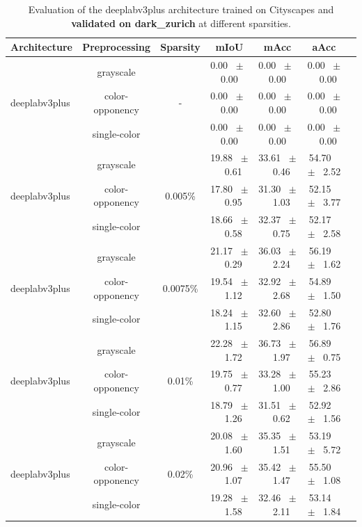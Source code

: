 \begin{table}[h]
  \centering
  \caption{Evaluation of the deeplabv3plus architecture trained on Cityscapes and \textbf{validated on dark_zurich} at different sparsities.}
  \begin{tabular}{@{}lccc ccc@{}}
    \toprule
    Architecture & Preprocessing & Sparsity & mIoU & mAcc & aAcc \\
    \midrule
    \midrule
    \midrule
    \multirow{3}{*}{deeplabv3plus} & grayscale & \multirow{3}{*}{-} & 0.00 ~$\pm$~ 0.00 & 0.00 ~$\pm$~ 0.00 & 0.00 ~$\pm$~ 0.00 \\
    & color-opponency & & 0.00 ~$\pm$~ 0.00 & 0.00 ~$\pm$~ 0.00 & 0.00 ~$\pm$~ 0.00 \\
    & single-color & & 0.00 ~$\pm$~ 0.00 & 0.00 ~$\pm$~ 0.00 & 0.00 ~$\pm$~ 0.00 \\
    \midrule
    \multirow{3}{*}{deeplabv3plus} & grayscale & \multirow{3}{*}{0.005\%} & 19.88 ~$\pm$~ 0.61 & 33.61 ~$\pm$~ 0.46 & 54.70 ~$\pm$~ 2.52 \\
    & color-opponency & & 17.80 ~$\pm$~ 0.95 & 31.30 ~$\pm$~ 1.03 & 52.15 ~$\pm$~ 3.77 \\
    & single-color & & 18.66 ~$\pm$~ 0.58 & 32.37 ~$\pm$~ 0.75 & 52.17 ~$\pm$~ 2.58 \\
    \midrule
    \multirow{3}{*}{deeplabv3plus} & grayscale & \multirow{3}{*}{0.0075\%} & 21.17 ~$\pm$~ 0.29 & 36.03 ~$\pm$~ 2.24 & 56.19 ~$\pm$~ 1.62 \\
    & color-opponency & & 19.54 ~$\pm$~ 1.12 & 32.92 ~$\pm$~ 2.68 & 54.89 ~$\pm$~ 1.50 \\
    & single-color & & 18.24 ~$\pm$~ 1.15 & 32.60 ~$\pm$~ 2.86 & 52.80 ~$\pm$~ 1.76 \\
    \midrule
    \multirow{3}{*}{deeplabv3plus} & grayscale & \multirow{3}{*}{0.01\%} & 22.28 ~$\pm$~ 1.72 & 36.73 ~$\pm$~ 1.97 & 56.89 ~$\pm$~ 0.75 \\
    & color-opponency & & 19.75 ~$\pm$~ 0.77 & 33.28 ~$\pm$~ 1.00 & 55.23 ~$\pm$~ 2.86 \\
    & single-color & & 18.79 ~$\pm$~ 1.26 & 31.51 ~$\pm$~ 0.62 & 52.92 ~$\pm$~ 1.56 \\
    \midrule
    \multirow{3}{*}{deeplabv3plus} & grayscale & \multirow{3}{*}{0.02\%} & 20.08 ~$\pm$~ 1.60 & 35.35 ~$\pm$~ 1.51 & 53.19 ~$\pm$~ 5.72 \\
    & color-opponency & & 20.96 ~$\pm$~ 1.07 & 35.42 ~$\pm$~ 1.47 & 55.50 ~$\pm$~ 1.08 \\
    & single-color & & 19.28 ~$\pm$~ 1.58 & 32.46 ~$\pm$~ 2.11 & 53.14 ~$\pm$~ 1.84 \\
    \midrule
    \bottomrule
  \end{tabular}
  \label{tab:sparse_deeplabv3plus_dark_zurich}
\end{table}